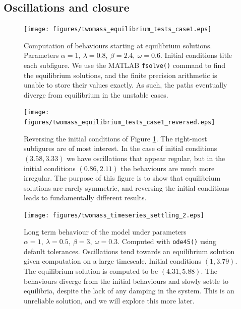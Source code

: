 \subsection{Oscillations and closure}

\begin{figure}[h!]
    \centering
    \texttt{[image: figures/twomass\_equilibrium\_tests\_case1.eps]}
    \caption{
        Computation of behaviours starting at equilibrium solutions.
        Parameters \(\alpha=1,~\lambda=0.8,~\beta=2.4,~\omega=0.6\).
        Initial conditions title each subfigure.
        We use the MATLAB \texttt{fsolve()} command to find the equilibrium solutions,
        and the finite precision arithmetic is unable to store their values exactly.
        As such, the paths eventually diverge from equilibrium in the unstable cases.
    }
    \label{fig:twomass_equilibria_timeseries}
\end{figure}

\begin{figure}[h!]
    \centering
    \texttt{[image: figures/twomass\_equilibrium\_tests\_case1\_reversed.eps]}
    \caption{
        Reversing the initial conditions of Figure \ref{fig:twomass_equilibria_timeseries}.
        The right-most subfigures are of most interest.
        In the case of initial conditions \((3.58,3.33)\) we have oscillations that appear regular,
        but in the initial conditions \((0.86,2.11)\) the behaviours are much more irregular.
        The purpose of this figure is to show that equilibrium solutions are rarely symmetric,
        and reversing the initial conditions leads to fundamentally different results.
    }
    \label{fig:twomass_equilibria_timeseries_2}
\end{figure}

\begin{figure}[h!]
    \centering
    \texttt{[image: figures/twomass\_timeseries\_settling\_2.eps]}
    \caption{
        Long term behaviour of the model under parameters \(\alpha=1,~\lambda=0.5,~\beta=3,~\omega=0.3\).
        Computed with \texttt{ode45()} using default tolerances.
        Oscillations tend towards an equilibrium solution given computation on a large timescale.
        Initial conditions \((1,3.79)\).
        The equilibrium solution is computed to be $(4.31,5.88)$.
        The behaviours diverge from the initial behaviours and slowly settle to equilibria,
        despite the lack of any damping in the system.
        This is an unreliable solution,
        and we will explore this more later.
    }
    \label{fig:twomass_timeseries_settling}
\end{figure}

